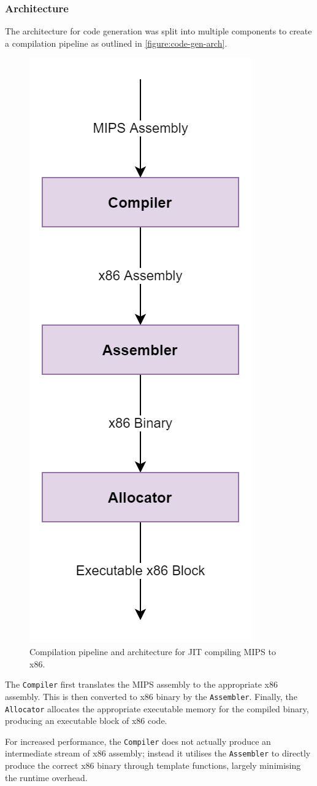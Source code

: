 \subsubsection{Architecture}

The architecture for code generation was split into multiple components to create a compilation pipeline as outlined in \autoref{figure:code-gen-arch}.

\begin{figure}[h]
    \centering
    \includegraphics[width=0.25\linewidth]{diagrams/code-gen.png}
    \caption{Compilation pipeline and architecture for JIT compiling MIPS to x86.}
    \label{figure:code-gen-arch}
\end{figure}

The \texttt{Compiler} first translates the MIPS assembly to the appropriate x86 assembly. This is then converted to x86 binary by the \texttt{Assembler}. Finally, the \texttt{Allocator} allocates the appropriate executable memory for the compiled binary, producing an executable block of x86 code.

For increased performance, the \texttt{Compiler} does not actually produce an intermediate stream of x86 assembly; instead it utilises the \texttt{Assembler} to directly produce the correct x86 binary through template functions, largely minimising the runtime overhead.